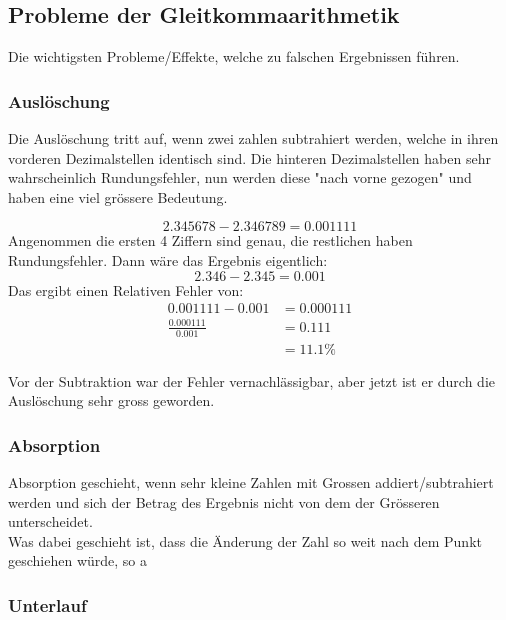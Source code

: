 \subsection{Probleme der Gleitkommaarithmetik}
Die wichtigsten Probleme/Effekte, welche zu falschen Ergebnissen führen.
\subsubsection{Auslöschung}
Die Auslöschung tritt auf, wenn zwei zahlen subtrahiert werden, welche in ihren vorderen Dezimalstellen identisch sind. Die hinteren Dezimalstellen haben sehr wahrscheinlich Rundungsfehler, nun werden diese "nach vorne gezogen" und haben eine viel grössere Bedeutung. \\
\begin{exmp}
	\begin{displaymath}
		2.345678 - 2.346789 = 0.001111
	\end{displaymath}
	Angenommen die ersten 4 Ziffern sind  genau, die restlichen haben Rundungsfehler. Dann wäre das Ergebnis eigentlich:
	\begin{displaymath}
		2.346-2.345=0.001
	\end{displaymath}
	Das ergibt einen Relativen Fehler von:
	\begin{align*}
		0.001111-0.001 &= 0.000111 \\
		\frac{0.000111}{0.001} &= 0.111 \\
		&= 11.1\%
	\end{align*}
\end{exmp}

Vor der Subtraktion war der Fehler vernachlässigbar, aber jetzt ist er durch die Auslöschung sehr gross geworden.

\subsubsection{Absorption}
Absorption geschieht, wenn sehr kleine Zahlen mit Grossen addiert/subtrahiert werden und sich der Betrag des Ergebnis nicht von dem der Grösseren unterscheidet. \\
Was dabei geschieht ist, dass die Änderung der Zahl so weit nach dem Punkt geschiehen würde, so a

\subsubsection{Unterlauf}
